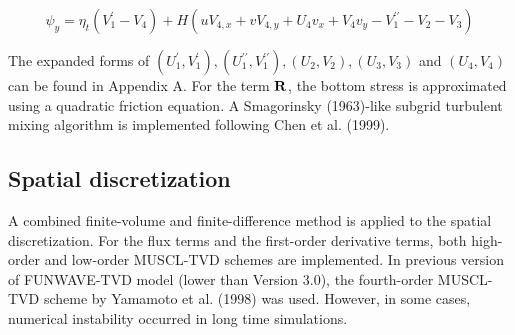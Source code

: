 \documentclass[11pt]{article}
\newcommand{\be}{\begin{equation}}
\newcommand{\ee}{\end{equation}}
\begin{document}
\be 
\psi_y =  \eta_t (V_1^{\prime}-V_4) + H \left( u V_{4,x} + v V_{4,y} + U_4 v_x +V_4 v_y - V_1^{\prime \prime} -  V_2 -  V_3 \right) 
\ee

The expanded forms of $(U_1^{\prime}, V_1^{\prime}), (U_1^{\prime \prime}, V_1^{\prime \prime}), (U_2, V_2), (U_3, V_3) $ and $ (U_4, V_4)$ can be found in Appendix A. For the term ${\bf R}$, the bottom stress is approximated using a quadratic friction equation. A Smagorinsky (1963)-like subgrid turbulent mixing algorithm is implemented following Chen et al. (1999). 

\subsection{Spatial discretization}

A combined finite-volume and finite-difference method is applied to the spatial discretization.
For the flux terms and the first-order derivative terms,
both high-order and low-order MUSCL-TVD schemes are implemented.
In previous version of FUNWAVE-TVD model (lower than Version 3.0), the fourth-order MUSCL-TVD scheme by Yamamoto et al. (1998) was used. However, in some cases, numerical instability occurred in long time simulations.
\end{document}

